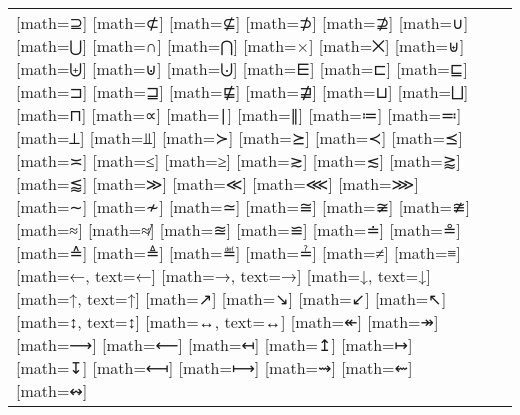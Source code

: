 \documentclass{unittest}
\begin{document}
\begin{tabular}{lcc}
\makerow{⊇}[math=⊇]
\makerow{⊄}[math=⊄]
\makerow{⊈}[math=⊈]
\makerow{⊅}[math=⊅]
\makerow{⊉}[math=⊉]
\makerow{∪}[math=∪]
\makerow{⋃}[math=⋃]
\makerow{∩}[math=∩]
\makerow{⋂}[math=⋂]
\makerow{×}[math=×]
\makerow{⨉}[math=⨉]
\midrule%
\makerow{⊎}[math=⊎]
\makerow{⨄}[math=⨄]
\makerow{⊍}[math=⊍]
\makerow{⨃}[math=⨃]
\makerow{⋿}[math=⋿]
\makerow{⊏}[math=⊏]
\makerow{⊑}[math=⊑]
\makerow{⊐}[math=⊐]
\makerow{⊒}[math=⊒]
\makerow{⋢}[math=⋢]
\makerow{⋣}[math=⋣]
\makerow{⊔}[math=⊔]
\makerow{⨆}[math=⨆]
\makerow{⊓}[math=⊓]
\midrule%
\makerow{∝}[math=∝]
\makerow{∣}[math=∣]
\makerow{∥}[math=∥]
\makerow{≔}[math=≔]
\makerow{≕}[math=≕]
\makerow{⟂}[math=⟂]
\makerow{⫫}[math=⫫]
\midrule%
\makerow{≻}[math=≻]
\makerow{⪰}[math=⪰]
\makerow{≺}[math=≺]
\makerow{⪯}[math=⪯]
\makerow{≍}[math=≍]
\makerow{≤}[math=≤]
\makerow{≥}[math=≥]
\makerow{≳}[math=≳]
\makerow{≲}[math=≲]
\makerow{⪆}[math=⪆]
\makerow{⪅}[math=⪅]
\makerow{≫}[math=≫]
\makerow{≪}[math=≪]
\makerow{⋘}[math=⋘]
\makerow{⋙}[math=⋙]
\midrule%
\makerow{∼}[math=∼]
\makerow{≁}[math=≁]
\makerow{≃}[math=≃]
\makerow{≅}[math=≅]
\makerow{≆}[math=≆]
\makerow{≇}[math=≇]
\makerow{≈}[math=≈]
\makerow{≉}[math=≉]
\makerow{≊}[math=≊]
\makerow{≌}[math=≌]
\makerow{≐}[math=≐]
\makerow{≗}[math=≗]
\makerow{≙}[math=≙]
\makerow{≜}[math=≜]
\makerow{≝}[math=≝]
\makerow{≟}[math=≟]
\makerow{≠}[math=≠]
\makerow{≡}[math=≡]
\midrule%
\makerow{←}[math=←, text=←]
\makerow{→}[math=→, text=→]
\makerow{↓}[math=↓, text=↓]
\makerow{↑}[math=↑, text=↑]
\makerow{↗}[math=↗]
\makerow{↘}[math=↘]
\makerow{↙}[math=↙]
\makerow{↖}[math=↖]
\makerow{↕}[math=↕, text=↕]
\makerow{↔}[math=↔, text=↔]
\makerow{↞}[math=↞]
\makerow{↠}[math=↠]
\makerow{⟶}[math=⟶]
\makerow{⟵}[math=⟵]
\midrule%
\makerow{↤}[math=↤]
\makerow{↥}[math=↥]
\makerow{↦}[math=↦]
\makerow{↧}[math=↧]
\makerow{⟻}[math=⟻]
\makerow{⟼}[math=⟼]
\midrule%
\makerow{⇝}[math=⇝]
\makerow{⇜}[math=⇜]
\makerow{↭}[math=↭]
\midrule%

\end{tabular}
\end{document}
